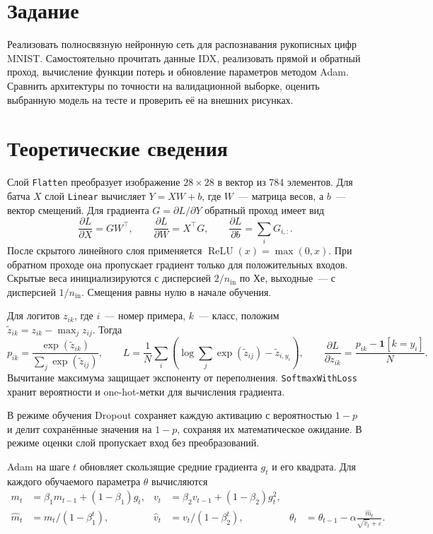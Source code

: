\section{Задание}
Реализовать полносвязную нейронную сеть для распознавания рукописных цифр MNIST. Самостоятельно прочитать данные IDX, реализовать прямой и обратный проход, вычисление функции потерь и обновление параметров методом Adam. Сравнить архитектуры по точности на валидационной выборке, оценить выбранную модель на тесте и проверить её на внешних рисунках.

\section{Теоретические сведения}
Слой \texttt{Flatten} преобразует изображение \(28\times28\) в вектор из 784 элементов. Для батча \(X\) слой \texttt{Linear} вычисляет \(Y=XW+b\), где \(W\)~--- матрица весов, а \(b\)~--- вектор смещений. Для градиента \(G=\partial L/\partial Y\) обратный проход имеет вид
\[
    \frac{\partial L}{\partial X}=GW^\top,\qquad
    \frac{\partial L}{\partial W}=X^\top G,\qquad
    \frac{\partial L}{\partial b}=\sum_i G_{i,:}.
\]
После скрытого линейного слоя применяется \(\operatorname{ReLU}(x)=\max(0,x)\). При обратном проходе она пропускает градиент только для положительных входов. Скрытые веса инициализируются с дисперсией \(2/n_{\mathrm{in}}\) по Хе, выходные~--- с дисперсией \(1/n_{\mathrm{in}}\). Смещения равны нулю в начале обучения.

Для логитов \(z_{ik}\), где \(i\)~--- номер примера, \(k\)~--- класс, положим \(\tilde z_{ik}=z_{ik}-\max_j z_{ij}\). Тогда
\[
  p_{ik}=\frac{\exp(\tilde z_{ik})}{\sum_j\exp(\tilde z_{ij})},\qquad
  L=\frac1N\sum_i\left(\log\sum_j\exp(\tilde z_{ij})-\tilde z_{i,y_i}\right),
  \qquad
  \frac{\partial L}{\partial z_{ik}}=\frac{p_{ik}-\mathbf 1[k=y_i]}N.
\]
Вычитание максимума защищает экспоненту от переполнения. \texttt{SoftmaxWithLoss} хранит вероятности и one-hot-метки для вычисления градиента.

В режиме обучения Dropout сохраняет каждую активацию с вероятностью \(1-p\) и делит сохранённые значения на \(1-p\), сохраняя их математическое ожидание. В режиме оценки слой пропускает вход без преобразований.

Adam на шаге \(t\) обновляет скользящие средние градиента \(g_t\) и его квадрата. Для каждого обучаемого параметра \(\theta\) вычисляются
\begin{align*}
 m_t&=\beta_1 m_{t-1}+(1-\beta_1)g_t,&
 v_t&=\beta_2 v_{t-1}+(1-\beta_2)g_t^2,\\
 \hat m_t&=m_t/(1-\beta_1^t),&
 \hat v_t&=v_t/(1-\beta_2^t),&
 \theta_t&=\theta_{t-1}-\alpha\frac{\hat m_t}{\sqrt{\hat v_t}+\varepsilon}.
\end{align*}

